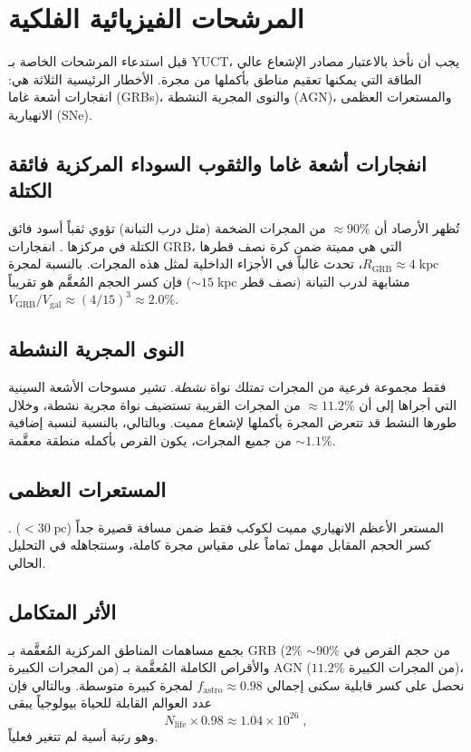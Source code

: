 \documentclass[11pt,a4paper]{article}
\begin{document}
	\section{المرشحات الفيزيائية الفلكية}
	\label{sec:astro_filters}
	قبل استدعاء المرشحات الخاصة بـ YUCT، يجب أن نأخذ بالاعتبار مصادر الإشعاع عالي الطاقة التي يمكنها تعقيم مناطق بأكملها من مجرة. الأخطار الرئيسية الثلاثة هي: انفجارات أشعة غاما (GRBs)، والنوى المجرية النشطة (AGN)، والمستعرات العظمى الانهيارية (SNe).
	
	\subsection{انفجارات أشعة غاما والثقوب السوداء المركزية فائقة الكتلة}
	\label{sec:grb}
	تُظهر الأرصاد أن \(\approx 90\%\) من المجرات الضخمة (مثل درب التبانة) تؤوي ثقباً أسود فائق الكتلة في مركزها \citep{Chandra2025}. انفجارات GRB، التي هي مميتة ضمن كرة نصف قطرها \(R_{\mathrm{GRB}} \approx 4\;\mathrm{kpc}\)، تحدث غالباً في الأجزاء الداخلية لمثل هذه المجرات. بالنسبة لمجرة مشابهة لدرب التبانة (نصف قطر \(\sim 15\;\mathrm{kpc}\)) فإن كسر الحجم المُعقَّم هو تقريباً \(V_{\mathrm{GRB}}/V_{\mathrm{gal}} \approx (4/15)^{3} \approx 2.0\%\).
	
	\subsection{النوى المجرية النشطة}
	\label{sec:agn}
	فقط مجموعة فرعية من المجرات تمتلك نواة \emph{نشطة}. تشير مسوحات الأشعة السينية التي أجراها \citet{Foord2017} إلى أن \(\approx 11.2\%\) من المجرات القريبة تستضيف نواة مجرية نشطة، وخلال طورها النشط قد تتعرض المجرة بأكملها لإشعاع مميت. وبالتالي، بالنسبة لنسبة إضافية \(\sim 1.1\%\) من جميع المجرات، يكون القرص بأكمله منطقة معقَّمة.
	
	\subsection{المستعرات العظمى}
	\label{sec:sne}
	المستعر الأعظم الانهياري مميت لكوكب فقط ضمن مسافة قصيرة جداً (\(< 30\;\mathrm{pc}\)) \citep{ThomasYelland2023}. كسر الحجم المقابل مهمل تماماً على مقياس مجرة كاملة، وسنتجاهله في التحليل الحالي.
	
	\subsection{الأثر المتكامل}
	\label{sec:total_astro}
	بجمع مساهمات المناطق المركزية المُعقَّمة بـ GRB (\(2\%\) من حجم القرص في \(\sim 90\%\) من المجرات الكبيرة) والأقراص الكاملة المُعقَّمة بـ AGN (\(11.2\%\) من المجرات الكبيرة)، نحصل على كسر قابلية سكنى إجمالي \(f_{\mathrm{astro}} \approx 0.98\) لمجرة كبيرة متوسطة. وبالتالي فإن عدد العوالم القابلة للحياة بيولوجياً يبقى
	\begin{equation}
		N_{\mathrm{life}} \times 0.98 \approx 1.04\times 10^{26}\; ,
	\end{equation}
	وهو رتبة أسية لم تتغير فعلياً.
	
\end{document}
